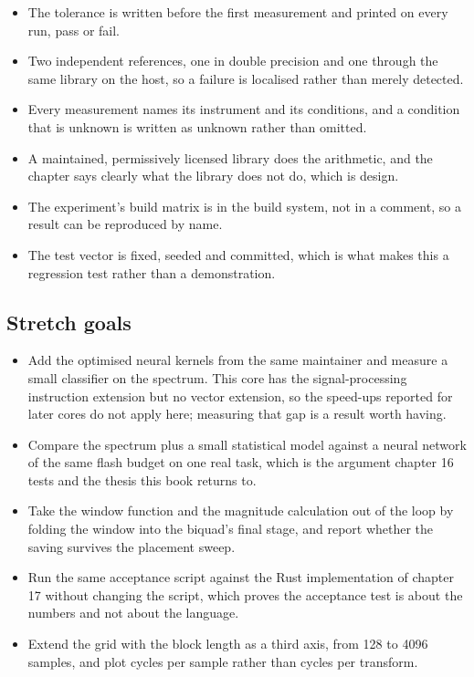 \begin{itemize}
\item The tolerance is written before the first measurement and printed on
every run, pass or fail.
\item Two independent references, one in double precision and one through the
same library on the host, so a failure is localised rather than merely
detected.
\item Every measurement names its instrument and its conditions, and a
condition that is unknown is written as unknown rather than omitted.
\item A maintained, permissively licensed library does the arithmetic, and the
chapter says clearly what the library does not do, which is design.
\item The experiment's build matrix is in the build system, not in a comment,
so a result can be reproduced by name.
\item The test vector is fixed, seeded and committed, which is what makes this
a regression test rather than a demonstration.
\end{itemize}

\subsection*{Stretch goals}

\begin{itemize}
\item Add the optimised neural kernels from the same maintainer and measure a
small classifier on the spectrum. This core has the signal-processing
instruction extension but no vector extension, so the speed-ups reported for
later cores do not apply here; measuring that gap is a result worth having.
\item Compare the spectrum plus a small statistical model against a neural
network of the same flash budget on one real task, which is the argument
chapter 16 tests and the thesis this book returns to.
\item Take the window function and the magnitude calculation out of the loop by
folding the window into the biquad's final stage, and report whether the saving
survives the placement sweep.
\item Run the same acceptance script against the Rust implementation of chapter
17 without changing the script, which proves the acceptance test is about the
numbers and not about the language.
\item Extend the grid with the block length as a third axis, from 128 to 4096
samples, and plot cycles per sample rather than cycles per transform.
\end{itemize}

